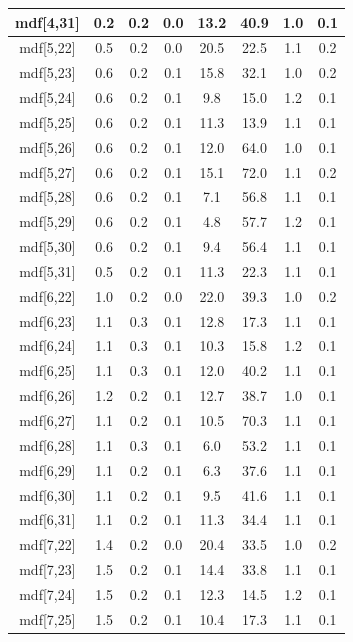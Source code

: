 \begin{longtable}{|c|c|c|c|c|c|c|c|}
\hline
mdf[4,31] & 0.2 & 0.2 & 0.0 & 13.2 & 40.9 & 1.0 & 0.1 \\
\hline
mdf[5,22] & 0.5 & 0.2 & 0.0 & 20.5 & 22.5 & 1.1 & 0.2 \\
\hline
mdf[5,23] & 0.6 & 0.2 & 0.1 & 15.8 & 32.1 & 1.0 & 0.2 \\
\hline
mdf[5,24] & 0.6 & 0.2 & 0.1 & 9.8 & 15.0 & 1.2 & 0.1 \\
\hline
mdf[5,25] & 0.6 & 0.2 & 0.1 & 11.3 & 13.9 & 1.1 & 0.1 \\
\hline
mdf[5,26] & 0.6 & 0.2 & 0.1 & 12.0 & 64.0 & 1.0 & 0.1 \\
\hline
mdf[5,27] & 0.6 & 0.2 & 0.1 & 15.1 & 72.0 & 1.1 & 0.2 \\
\hline
mdf[5,28] & 0.6 & 0.2 & 0.1 & 7.1 & 56.8 & 1.1 & 0.1 \\
\hline
mdf[5,29] & 0.6 & 0.2 & 0.1 & 4.8 & 57.7 & 1.2 & 0.1 \\
\hline
mdf[5,30] & 0.6 & 0.2 & 0.1 & 9.4 & 56.4 & 1.1 & 0.1 \\
\hline
mdf[5,31] & 0.5 & 0.2 & 0.1 & 11.3 & 22.3 & 1.1 & 0.1 \\
\hline
mdf[6,22] & 1.0 & 0.2 & 0.0 & 22.0 & 39.3 & 1.0 & 0.2 \\
\hline
mdf[6,23] & 1.1 & 0.3 & 0.1 & 12.8 & 17.3 & 1.1 & 0.1 \\
\hline
mdf[6,24] & 1.1 & 0.3 & 0.1 & 10.3 & 15.8 & 1.2 & 0.1 \\
\hline
mdf[6,25] & 1.1 & 0.3 & 0.1 & 12.0 & 40.2 & 1.1 & 0.1 \\
\hline
mdf[6,26] & 1.2 & 0.2 & 0.1 & 12.7 & 38.7 & 1.0 & 0.1 \\
\hline
mdf[6,27] & 1.1 & 0.2 & 0.1 & 10.5 & 70.3 & 1.1 & 0.1 \\
\hline
mdf[6,28] & 1.1 & 0.3 & 0.1 & 6.0 & 53.2 & 1.1 & 0.1 \\
\hline
mdf[6,29] & 1.1 & 0.2 & 0.1 & 6.3 & 37.6 & 1.1 & 0.1 \\
\hline
mdf[6,30] & 1.1 & 0.2 & 0.1 & 9.5 & 41.6 & 1.1 & 0.1 \\
\hline
mdf[6,31] & 1.1 & 0.2 & 0.1 & 11.3 & 34.4 & 1.1 & 0.1 \\
\hline
mdf[7,22] & 1.4 & 0.2 & 0.0 & 20.4 & 33.5 & 1.0 & 0.2 \\
\hline
mdf[7,23] & 1.5 & 0.2 & 0.1 & 14.4 & 33.8 & 1.1 & 0.1 \\
\hline
mdf[7,24] & 1.5 & 0.2 & 0.1 & 12.3 & 14.5 & 1.2 & 0.1 \\
\hline
mdf[7,25] & 1.5 & 0.2 & 0.1 & 10.4 & 17.3 & 1.1 & 0.1 \\
\hline

\end{longtable}
